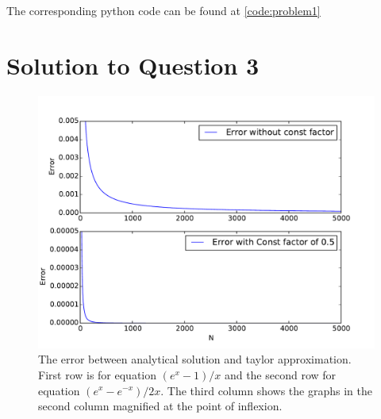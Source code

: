 \documentclass[a4paper,11pt]{article}
\begin{document}
The corresponding python code can be found at \ref{code:problem1}
\clearpage

\section{Solution to Question 3}\label{prob3}



\begin{figure}[h]
	\centering
	\includegraphics[scale=0.45]{figure_3.pdf}
	\caption{The error between analytical solution and taylor approximation. First row is for equation $(e^x - 1)/x$ and the second row for equation $(e^x - e^{-x}) / 2x$. The third column shows the graphs in the second column magnified at the point of inflexion.}
	\label{fig:solution3_fig}
\end{figure}
\end{document}
